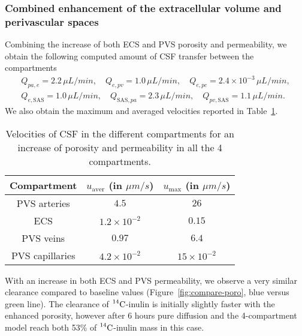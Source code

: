 \documentclass[10pt]{article}
\newcommand{\1}{^{(1)}}
\newcommand{\2}{^{(2)}}
\newcommand{\Cinulin}{$\prescript{14}{}{\text{C}}$-inulin }
\begin{document}

\subsubsection{Combined enhancement of the extracellular volume and perivascular spaces}
\label{subsec:combined-res}


Combining the increase of both ECS and PVS porosity and permeability, we obtain the following computed amount of CSF transfer between the compartments
\[
\begin{aligned}
    Q_{pa,e} = 2.2 \, \si{\mu L/min},\quad Q_{e,pv} = 1.0 \,  \si{\mu L/min},\quad Q_{e,pc} = 2.4\times 10^{-3} \, \si{\mu L/min}, \\
    Q_{e,\text{SAS}} = 1.0 \, \si{\mu L/min} , \quad Q_{\text{SAS},pa} = 2.3 \, \si{\mu L/min},\quad Q_{pv,\text{SAS}} = 1.1 \, \si{\mu L/min}.
\end{aligned}
\]
We also obtain the maximum and averaged velocities reported in Table~\ref{tab:velocities-enhanced}. 



\begin{table}[h!]
    \centering
    \begin{tabular}{c|c|c}
       Compartment & $u_\text{aver}$ (in $\si{\mu m/s}$) & $u_\text{max}$ (in $\si{\mu m/s}$) \\
       \hline
    
        PVS arteries & $4.5$ & $26$ \\
        ECS &  $1.2 \times 10^{-2}$ & $0.15 $ \\
        PVS veins & $0.97$ & $6.4$ \\
        PVS capillaries & $4.2\times 10^{-2}$ & $15 \times 10^{-2}$
    \end{tabular}
    \caption{Velocities of CSF in the different compartments for an increase of porosity and permeability in all the 4 compartments.}
    \label{tab:velocities-enhanced}
\end{table}
With an increase in both ECS and PVS permeability, we observe a very similar clearance compared to baseline values (Figure~\ref{fig:compare-poro}, blue versus green line). The clearance of \Cinulin is initially slightly faster with the enhanced porosity, however after 6 hours pure diffusion and the 4-compartment model reach both 53\% of \Cinulin mass in this case. 
\end{document}

